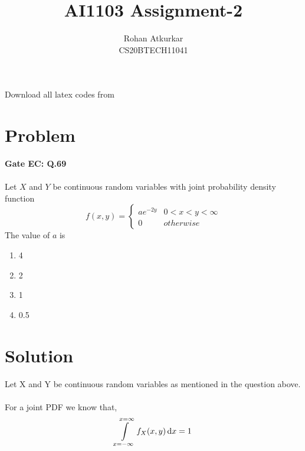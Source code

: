 \documentclass[journal,12pt,twocolumn]{IEEEtran}
\title{AI1103 Assignment-2}
\author{Rohan Atkurkar\\ CS20BTECH11041}
\date{}
\providecommand{\brak}[1]{\ensuremath{\left(#1\right)}}
\begin{document}
\maketitle
\noindent

\vspace{0.3cm}

Download all latex codes from  

\vspace{0.3cm}  
    
   
\vspace{0.5cm}
\section*{Problem}
\textbf{ Gate EC: Q.69} \\\\

Let $X$ and $Y$ be continuous random variables with joint probability density function 
\begin{equation*}
    f\brak{x,y}= \begin{cases} 
      ae^{-2y} & 0 < x < y <\infty  \\
       0 & otherwise
   \end{cases}
\end{equation*}
The value of $a$ is
\begin{enumerate}[label=(\Alph*)]
\item 4 
\item 2
\item 1
\item  0.5
\end{enumerate} 



\section*{Solution}
Let X and Y be continuous random variables as mentioned in the question above.\\\\
For a joint PDF we know that,
$$\int \limits_{x=-\infty}^{x=\infty} f_X(x,y) \, \mathrm{d}x = 1\\\\$$
\end{document}
